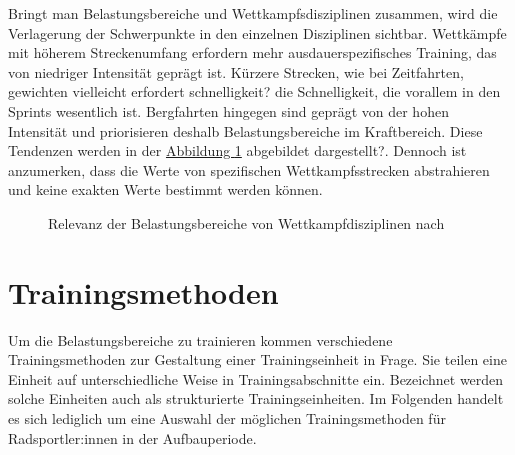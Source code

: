 Bringt man Belastungsbereiche und Wettkampfsdisziplinen zusammen, wird die Verlagerung der Schwerpunkte in den einzelnen Disziplinen sichtbar. Wettkämpfe mit höherem Streckenumfang erfordern mehr ausdauerspezifisches Training, das von niedriger Intensität geprägt ist. Kürzere Strecken, wie bei Zeitfahrten, gewichten  vielleicht erfordert schnelligkeit? die Schnelligkeit, die vorallem in den Sprints wesentlich ist. Bergfahrten hingegen sind geprägt von der hohen Intensität und priorisieren deshalb Belastungsbereiche im Kraftbereich. Diese Tendenzen werden in der \hyperref[fig:wettkampfLeistungsbereiche]{Abbildung \ref{fig:wettkampfLeistungsbereiche}} abgebildet dargestellt?. Dennoch ist anzumerken, dass die Werte von spezifischen Wettkampfsstrecken abstrahieren und keine exakten Werte bestimmt werden können. 
\begin{figure}[hb]
    \centering
    \caption{Relevanz der Belastungsbereiche von Wettkampfdisziplinen nach \cite[30]{Radsporttraining}}
    \label{fig:wettkampfLeistungsbereiche}
\end{figure}
\section{Trainingsmethoden}
\label{grundlagen:methoden}
Um die Belastungsbereiche zu trainieren kommen verschiedene Trainingsmethoden zur Gestaltung einer Trainingseinheit in Frage. Sie teilen eine Einheit auf unterschiedliche Weise in Trainingsabschnitte ein. Bezeichnet werden solche Einheiten auch als strukturierte Trainingseinheiten. Im Folgenden handelt es sich lediglich um eine Auswahl der möglichen Trainingsmethoden für Radsportler:innen in der Aufbauperiode.\cite[40-43]{Radsporttraining}
